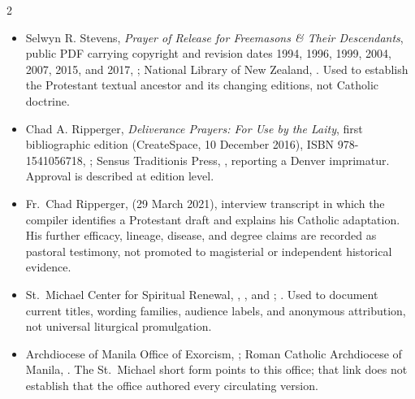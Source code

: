 \begin{multicols}{2}
{\footnotesize
\begin{itemize}[itemsep=0.1em,topsep=0.15em]
\item Selwyn R. Stevens, \emph{Prayer of Release for Freemasons \& Their Descendants}, public PDF carrying copyright and revision dates 1994, 1996, 1999, 2004, 2007, 2015, and 2017, ; National Library of New Zealand, . Used to establish the Protestant textual ancestor and its changing editions, not Catholic doctrine.
\item Chad A. Ripperger, \emph{Deliverance Prayers: For Use by the Laity}, first bibliographic edition (CreateSpace, 10 December 2016), ISBN 978-1541056718, ; Sensus Traditionis Press, , reporting a Denver imprimatur. Approval is described at edition level.
\item Fr.~Chad Ripperger,  (29 March 2021), interview transcript in which the compiler identifies a Protestant draft and explains his Catholic adaptation. His further efficacy, lineage, disease, and degree claims are recorded as pastoral testimony, not promoted to magisterial or independent historical evidence.
\item St.~Michael Center for Spiritual Renewal, , , and ; . Used to document current titles, wording families, audience labels, and anonymous attribution, not universal liturgical promulgation.
\item Archdiocese of Manila Office of Exorcism, ; Roman Catholic Archdiocese of Manila, . The St.~Michael short form points to this office; that link does not establish that the office authored every circulating version.
\end{itemize}}


\end{multicols}
